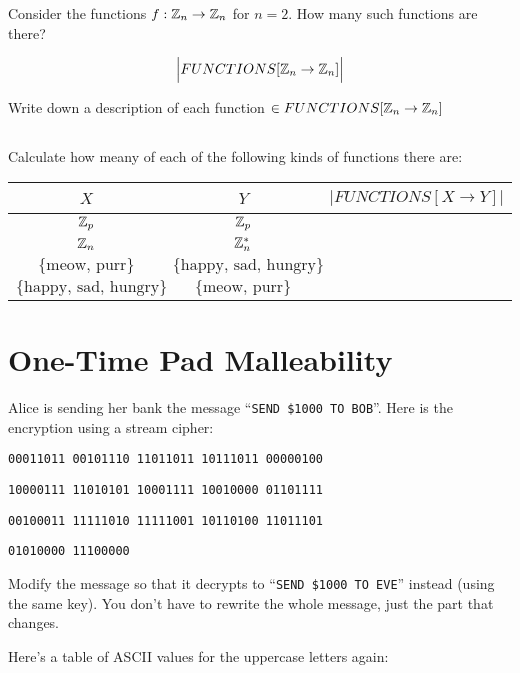 \documentclass[12pt]{article}
\begin{document}
Consider the functions $f: \mathbb{Z}_n \to \mathbb{Z}_n$ for $n = 2$. How many such functions are there?

$$\Big|FUNCTIONS[\mathbb{Z}_n \to \mathbb{Z}_n]\Big|$$

Write down a description of each function $\in FUNCTIONS[\mathbb{Z}_n \to \mathbb{Z}_n]$

\subsection{}
Calculate how meany of each of the following kinds of functions there are:

\begin{center}
\begin{tabular}{|c|c||c|}
\hline
$X$ & $Y$ & $\overset{}{\underset{}{\Big|FUNCTIONS[X \to Y]\Big|}}$ \\
\hline
$\mathbb{Z}_p$ & $\mathbb{Z}_p$ & $\overset{}{\underset{}{~}}$ \\
\hline
$\mathbb{Z}_n$ & $\mathbb{Z}_n^*$ & $\overset{}{\underset{}{~}}$ \\
\hline
$\{\text{meow, purr}\}$ & $\{\text{happy, sad, hungry}\}$ & $\overset{}{\underset{}{~}}$ \\
\hline
$\{\text{happy, sad, hungry}\}$ & $\{\text{meow, purr}\}$ & $\overset{}{\underset{}{~}}$ \\
\hline
\end{tabular}
\end{center}


\newpage

\section{One-Time Pad Malleability}


Alice is sending her bank the message ``{\tt SEND \$1000 TO BOB}''. Here is the encryption using a stream cipher:\\

{
\tt{00011011~00101110~11011011~10111011~00000100}

\tt{10000111~11010101~10001111~10010000~01101111}

\tt{00100011~11111010~11111001~10110100~11011101}

\tt{01010000~11100000}\\
}

Modify the message so that it decrypts to ``{\tt SEND \$1000 TO EVE}'' instead (using the same key). You don't have to rewrite the whole message, just the part that changes.

Here's a table of ASCII values for the uppercase letters again:
\end{document}
